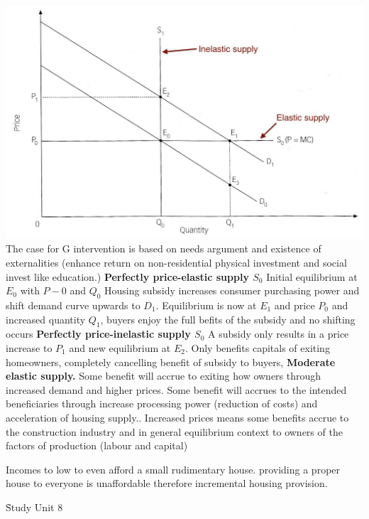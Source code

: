 \documentclass[12pt]{examnotes}
\begin{document}
\includegraphics[scale=0.3]{./imgs/84.jpg} 
\ra The case for G intervention is based on needs  argument and existence of externalities (enhance return on non-residential physical investment and social invest like education.)
{\bf Perfectly price-elastic supply $S_0$}
\ra Initial equilibrium at $E_0$ with ${P-0}$ and ${Q_0}$
\ra Housing subsidy increases consumer purchasing power and shift demand curve upwards to ${D_1}$.
\ra Equilibrium is now at ${E_1}$ and price ${P_0}$ and increased quantity ${Q_1}$, buyers enjoy the full befits of the subsidy and no shifting occurs
{\bf Perfectly price-inelastic supply $S_0$}
\ra A subsidy only results in a price increase to ${P_1}$ and new equilibrium at ${E_2}$. 
\ra Only benefits capitals of exiting homeowners, completely cancelling benefit of subsidy to buyers,
{\bf Moderate elastic supply.}
\ra Some benefit will accrue to exiting how owners through increased demand and higher prices. 
\ra Some benefit will accrues to the intended beneficiaries through increase processing power (reduction of costs) and acceleration of housing supply..
\ra Increased prices means some benefits accrue to the construction industry and in general equilibrium context to owners of the factors of production (labour and capital)


\ra Incomes to low to even afford a small rudimentary house.
\ra providing a proper house to everyone is unaffordable therefore incremental housing provision.
\ra {}
 
\h{Study Unit 8}
\end{document}
